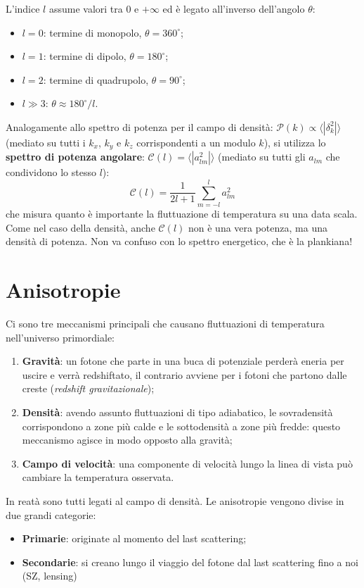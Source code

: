 \newpage
\noindent L'indice $l$ assume valori tra $0$ e $+\infty$ ed è legato all'inverso dell'angolo $\theta$:
\begin{itemize}
    \item $l=0$: termine di monopolo, $\theta=360^\circ $;
    \item $l=1$: termine di dipolo, $\theta=180^\circ $;
    \item $l=2$: termine di quadrupolo, $\theta=90^\circ $;
    \item $l \gg 3$: $\theta\approx 180^\circ /l$.
\end{itemize}

Analogamente allo spettro di potenza per il campo di densità: $\mathcal{P}(k)\propto \langle|\delta_k^2| \rangle $ (mediato su tutti i $k_x$, $k_y$ e $k_z$ corrispondenti a un modulo $k$), si utilizza lo \textbf{spettro di potenza angolare}: $\mathcal{C}(l) =  \langle|a_{lm}^2| \rangle$ (mediato su tutti gli $a_{lm}$ che condividono lo stesso $l$):
\begin{equation}
    \mathcal{C}(l)=\frac{1}{2l+1}\sum_{m=-l}^l a_{lm}^2
\end{equation}
che misura quanto è importante la fluttuazione di temperatura su una data scala. Come nel caso della densità, anche $\mathcal{C}(l)$ non è una vera potenza, ma una densità di potenza. Non va confuso con lo spettro energetico, che è la plankiana!

\section{Anisotropie}
Ci sono tre meccanismi principali che causano fluttuazioni di temperatura nell'universo primordiale:
\begin{enumerate}
    \item \textbf{Gravità}: un fotone che parte in una buca di potenziale perderà eneria per uscire e verrà redshiftato, il contrario avviene per i fotoni che partono dalle creste (\textit{redshift gravitazionale});
    \item \textbf{Densità}: avendo assunto fluttuazioni di tipo adiabatico, le sovradensità corrispondono a zone più calde e le sottodensità a zone più fredde: questo meccanismo agisce in modo opposto alla gravità;
    \item \textbf{Campo di velocità}: una componente di velocità lungo la linea di vista può cambiare la temperatura osservata.
\end{enumerate}
In reatà sono tutti legati al campo di densità. Le anisotropie vengono divise in due grandi categorie:
\begin{itemize}
    \item \textbf{Primarie}: originate al momento del last scattering;
    \item \textbf{Secondarie}: si creano lungo il viaggio del fotone dal last scattering fino a noi (SZ, lensing)
\end{itemize}

